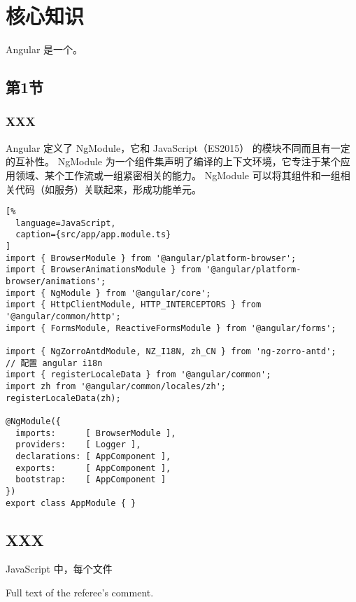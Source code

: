\documentclass{YangBook}
\begin{document}
\chapter{核心知识}

Angular 是一个。


\section{第1节}

\subsection{XXX}

Angular 定义了 NgModule，它和 JavaScript（ES2015） 的模块不同而且有一定的互补性。 NgModule 为一个组件集声明了编译的上下文环境，它专注于某个应用领域、某个工作流或一组紧密相关的能力。 NgModule 可以将其组件和一组相关代码（如服务）关联起来，形成功能单元。

\begin{lstlisting}[%
  language=JavaScript,
  caption={src/app/app.module.ts}
]
import { BrowserModule } from '@angular/platform-browser';
import { BrowserAnimationsModule } from '@angular/platform-browser/animations';
import { NgModule } from '@angular/core';
import { HttpClientModule, HTTP_INTERCEPTORS } from '@angular/common/http';
import { FormsModule, ReactiveFormsModule } from '@angular/forms';

import { NgZorroAntdModule, NZ_I18N, zh_CN } from 'ng-zorro-antd';
// 配置 angular i18n
import { registerLocaleData } from '@angular/common';
import zh from '@angular/common/locales/zh';
registerLocaleData(zh);

@NgModule({
  imports:      [ BrowserModule ],
  providers:    [ Logger ],
  declarations: [ AppComponent ],
  exports:      [ AppComponent ],
  bootstrap:    [ AppComponent ]
})
export class AppModule { }
\end{lstlisting}

\clearpage

\section{XXX}

\begin{textbox}{\faStickyNoteO{}}
  JavaScript 中，每个文件
\end{textbox}

\begin{commentbox}
	Full text of the referee's comment.
\end{commentbox}
\end{document}
